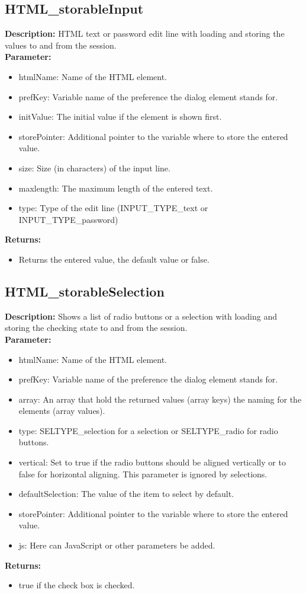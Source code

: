 \subsection{HTML\_storableInput}
\textbf{Description:} HTML text or password edit line with loading and storing the values to and from the session.\\
\textbf{Parameter:}
\begin{itemize}
\item htmlName: Name of the HTML element.
\item prefKey: Variable name of the preference the dialog element stands for.
\item initValue: The initial value if the element is shown first.
\item storePointer: Additional pointer to the variable where to store the entered value.
\item size: Size (in characters) of the input line.
\item maxlength: The maximum length of the entered text.
\item type: Type of the edit line (INPUT\_TYPE\_text or INPUT\_TYPE\_password)
\end{itemize}
\textbf{Returns:}
\begin{itemize}
\item Returns the entered value, the default value or false.
\end{itemize}

\subsection{HTML\_storableSelection}
\textbf{Description:} Shows a list of radio buttons or a selection with loading and storing the checking state to and from the session.\\
\textbf{Parameter:}
\begin{itemize}
\item htmlName: Name of the HTML element.
\item prefKey: Variable name of the preference the dialog element stands for.
\item array: An array that hold the returned values (array keys) the naming for the elements (array values).
\item type: SELTYPE\_selection for a selection or SELTYPE\_radio for radio buttons.
\item vertical: Set to true if the radio buttons should be aligned vertically or to false for horizontal aligning. This parameter is ignored by selections.
\item defaultSelection: The value of the item to select by default.
\item storePointer: Additional pointer to the variable where to store the entered value.
\item js: Here can JavaScript or other parameters be added.
\end{itemize}
\textbf{Returns:}
\begin{itemize}
\item true if the check box is checked.
\end{itemize}

